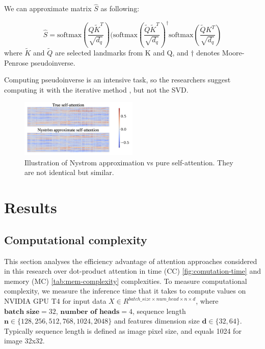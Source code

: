 
We can approximate matrix $\hat{S}$ as following:

$$\hat{S} = \text{softmax}(\frac{Q\tilde{K}^T}{\sqrt{d_q}}) (\text{softmax}(\frac{\tilde{Q}\tilde{K}^T}{\sqrt{d_q}})^{\dagger} \text{softmax}(\frac{\tilde{Q}{K}^T}{\sqrt{d_q}})$$
where $\tilde{K}$ and $\tilde{Q}$ are selected landmarks from K and Q, and $\dagger$ denotes Moore-Penrose pseudoinverse.  

Computing pseudoinverse is an intensive task, so the researchers suggest computing it with the iterative method \cite{pseudoiverse}, but not the SVD.

\begin{figure}[h]
\centering
\includegraphics[width=0.5\textwidth]{nystrom-approximation.png}
\caption{\label{fig:nystrom-approximation}Illustration of Nystrom approximation vs pure self-attention. They are not identical but similar.}
\end{figure}

\section{Results}

\subsection{Computational complexity}

This section analyses the efficiency advantage of attention approaches considered in this research over dot-product attention in time (CC) \ref{fig:comutation-time} and memory (MC) \ref{tab:mem-complexity} complexities. 
To measure computational complexity, we measure the inference time that it takes to compute values on NVIDIA GPU T4 for input data $ X \in R^{ batch\_size \times num\_head \times n \times d }$, where $\textbf{batch size}=32$, $\textbf{number of heads}=4$, sequence length $\textbf{n} \in \{128, 256, 512, 768, 1024, 2048\}$ and features dimension size $\textbf{d} \in \{32, 64\}$.
Typically sequence length is defined as image pixel size, and equals 1024 for image 32x32.


